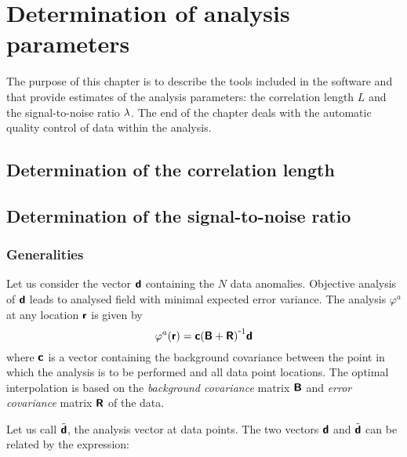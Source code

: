\chapter[Determination of analysis parameters]{Determination of analysis parameters \label{chap:analysisparameters}}

The purpose of this chapter is to describe the tools included in the \diva software and that provide estimates of the analysis parameters: the correlation length $L$ and the signal-to-noise ratio $\lambda$. The end of the chapter deals with the automatic quality control of data within the analysis.

\minitoc


\section{Determination of the correlation length}


\section{Determination of the signal-to-noise ratio}

\subsection{Generalities}

Let us consider the vector $\mbox{\boldmath $ \protect\mathsf{d} $}$ containing the $N$ data anomalies. Objective analysis of $\mbox{\boldmath $ \protect\mathsf{d} $}$ leads to analysed field with minimal expected error variance. The analysis $\varphi^a$ at any location $\mbox{\boldmath $ \protect\mathsf{r} $}$ is given by
\begin{equation}
\varphi^a(\mbox{\boldmath $ \protect\mathsf{r} $}) = \mbox{\boldmath $ \protect\mathsf{c} $} {( \mbox{\boldmath $ \protect\mathsf{B} $} + \mbox{\boldmath $ \protect\mathsf{R} $} )}^{ \mbox{\small{-}} 1} \mbox{\boldmath $ \protect\mathsf{d} $}
\end{equation}
where $\mbox{\boldmath $ \protect\mathsf{c} $}$ is a vector containing the background covariance between the point in which the analysis is to be performed and all data point locations. The optimal interpolation is based on the \textit{background covariance} matrix $\mbox{\boldmath $ \protect\mathsf{B} $}$ and \textit{error covariance} matrix $\mbox{\boldmath $ \protect\mathsf{R} $}$ of the data.
 
Let us call $\tilde{\mbox{\boldmath $ \protect\mathsf{d} $}}$, the analysis vector at data points. The two vectors ${\mbox{\boldmath $ \protect\mathsf{d} $}}$ and $\tilde{\mbox{\boldmath $ \protect\mathsf{d} $}}$ can be related by the expression:

